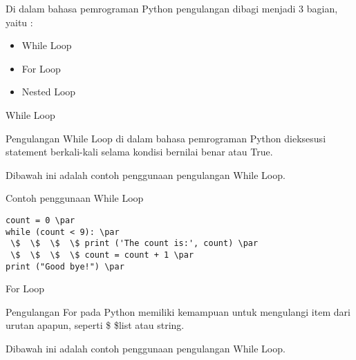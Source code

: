 Di dalam bahasa pemrograman Python pengulangan dibagi menjadi 3 bagian, yaitu : 
\begin{itemize}
\item
While Loop 
\item
For Loop 
\item
Nested Loop 
\end{itemize} 
\vspace{\baselineskip}
\vspace{\baselineskip}
\vspace{12pt}
\noindent 
While Loop \par
\noindent 
Pengulangan While Loop di dalam bahasa pemrograman Python dieksesusi statement berkali-kali selama kondisi bernilai benar atau True. \par
\noindent 
\vspace{\baselineskip}
\vspace{\baselineskip}
Dibawah ini adalah contoh penggunaan pengulangan While Loop. \par
\noindent 
\vspace{\baselineskip}
\vspace{12pt}
\noindent 
Contoh penggunaan While Loop \par
\noindent 
\vspace{\baselineskip}
\vspace{\baselineskip}
\begin{verbatim}
count = 0 \par
while (count < 9): \par
 \$  \$  \$  \$ print ('The count is:', count) \par
 \$  \$  \$  \$ count = count + 1 \par
print ("Good bye!") \par
\end{verbatim}
\vspace{\baselineskip}
\vspace{\baselineskip}
\vspace{\baselineskip}
\vspace{12pt}
\noindent 
For Loop \par
\noindent 
Pengulangan For pada Python memiliki kemampuan untuk mengulangi item dari urutan apapun, seperti \$  \$list atau string. \par
\noindent 
 \vspace{\baselineskip}
\vspace{\baselineskip}
Dibawah ini adalah contoh penggunaan pengulangan While Loop. \par
\noindent 
